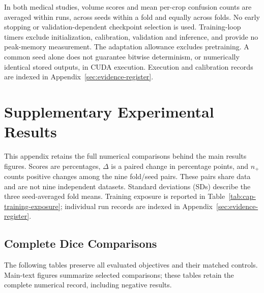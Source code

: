 \documentclass[12pt,a4paper]{article}
\begin{document}
In both medical studies, volume scores and mean per-crop confusion counts
are averaged within runs, across seeds within a fold and equally across
folds. No early stopping or validation-dependent checkpoint selection is
used. Training-loop timers exclude initialization, calibration, validation
and inference, and provide no peak-memory measurement. The adaptation
allowance excludes pretraining. A common seed alone does not guarantee
bitwise determinism, or numerically identical stored outputs, in CUDA
execution. Execution and calibration records are indexed in
Appendix~\ref{sec:evidence-register}.

\clearpage
\section{Supplementary Experimental Results}
\label{sec:extended-results}

This appendix retains the full numerical comparisons behind the main
results figures. Scores are percentages, $\Delta$ is a paired change in
percentage points, and $n_+$ counts positive changes among the nine
fold/seed pairs. These pairs share data and are not nine independent
datasets. Standard deviations (SDs) describe the three seed-averaged fold
means. Training exposure is reported in
Table~\ref{tab:cap-training-exposure}; individual run records are indexed
in Appendix~\ref{sec:evidence-register}.

\subsection{Complete Dice Comparisons}\label{sec:complete-result-tables}
The following tables preserve all evaluated objectives and their matched
controls. Main-text figures summarize selected comparisons; these tables
retain the complete numerical record, including negative results.
\end{document}
